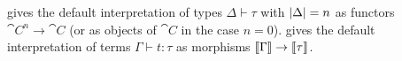  gives the default interpretation of types $\Delta \vdash \tau$ with
$|\Delta| = n$ as functors $\cat{C}^n \to \cat{C}$ (or as objects of $\cat{C}$ in the case $n = 0$).
 gives the default interpretation of terms $\Gamma \vdash t: \tau$ as
morphisms $\llbracket \Gamma \rrbracket \to \llbracket \tau \rrbracket$.

